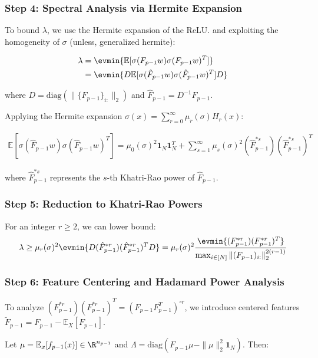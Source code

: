 \documentclass[a4paper]{article}
\newcommand{\E}{\mathbb{E}}
\theoremstyle{plain}
\theoremstyle{definition}
\theoremstyle{remark}
\begin{document}
\subsubsection{Step 4: Spectral Analysis via Hermite Expansion}

To bound $\lambda$, we use the Hermite expansion of the ReLU. and exploiting the homogeneity of $\sigma$ (unless, generalized hermite):

\begin{align}
\lambda &= \evmin{\E[\sigma(F_{p-1}w)\sigma(F_{p-1}w)^T]} \\
&= \evmin{D \E[\sigma(\hat{F}_{p-1}w)\sigma(\hat{F}_{p-1}w)^T] D}
\end{align}

where $D = \text{diag}(\|\{F_{p-1}\}_{i:}\|_2)$ and $\hat{F}_{p-1} = D^{-1}F_{p-1}$.

Applying the Hermite expansion $\sigma(x) = \sum_{r=0}^{\infty} \mu_r(\sigma) H_r(x)$:

\begin{align}
\E[\sigma(\hat{F}_{p-1}w)\sigma(\hat{F}_{p-1}w)^T] = \mu_0(\sigma)^2 \mathbf{1}_N \mathbf{1}_N^T + \sum_{s=1}^{\infty} \mu_s(\sigma)^2 (\hat{F}_{p-1}^{*s})(\hat{F}_{p-1}^{*s})^T
\end{align}

where $\hat{F}_{p-1}^{*s}$ represents the $s$-th Khatri-Rao power of $\hat{F}_{p-1}$.

\subsubsection{Step 5: Reduction to Khatri-Rao Powers}

For an integer $r \geq 2$, we can lower bound:
\begin{align}
\lambda \geq \mu_r(\sigma)^2 \evmin{D(\hat{F}_{p-1}^{*r})(\hat{F}_{p-1}^{*r})^T D} = \mu_r(\sigma)^2 \frac{\evmin{(F_{p-1}^{*r})(F_{p-1}^{*r})^T}}{\max_{i \in [N]} \|(F_{p-1})_{i:}\|_2^{2(r-1)}}
\end{align}

\subsubsection{Step 6: Feature Centering and Hadamard Power Analysis}

To analyze $(F_{p-1}^{*r})(F_{p-1}^{*r})^T = (F_{p-1}F_{p-1}^T)^{\circ r}$, we introduce centered features $\tilde{F}_{p-1} = F_{p-1} - \E_X[F_{p-1}]$. 

Let $\mu = \E_x[f_{p-1}(x)] \in \R^{n_{p-1}}$ and $\Lambda = \text{diag}(F_{p-1}\mu - \|\mu\|_2^2 \mathbf{1}_N)$. Then:
\end{document}

